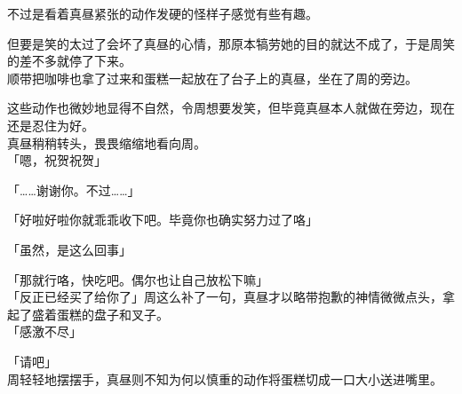 不过是看着真昼紧张的动作发硬的怪样子感觉有些有趣。

但要是笑的太过了会坏了真昼的心情，那原本犒劳她的目的就达不成了，于是周笑的差不多就停了下来。\\

顺带把咖啡也拿了过来和蛋糕一起放在了台子上的真昼，坐在了周的旁边。

这些动作也微妙地显得不自然，令周想要发笑，但毕竟真昼本人就做在旁边，现在还是忍住为好。\\

真昼稍稍转头，畏畏缩缩地看向周。\\

「嗯，祝贺祝贺」

「……谢谢你。不过……」

「好啦好啦你就乖乖收下吧。毕竟你也确实努力过了咯」

「虽然，是这么回事」

「那就行咯，快吃吧。偶尔也让自己放松下嘛」\\

「反正已经买了给你了」周这么补了一句，真昼才以略带抱歉的神情微微点头，拿起了盛着蛋糕的盘子和叉子。\\

「感激不尽」

「请吧」\\

周轻轻地摆摆手，真昼则不知为何以慎重的动作将蛋糕切成一口大小送进嘴里。\\

